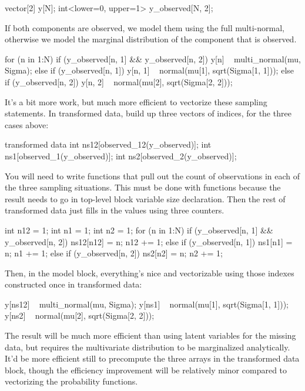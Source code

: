 \begin{stancode}
vector[2] y[N];
int<lower=0, upper=1> y_observed[N, 2];
\end{stancode}

If both components are observed, we model them using the full
multi-normal, otherwise we model the marginal distribution of the
component that is observed.

\begin{stancode}
for (n in 1:N) {
  if (y_observed[n, 1] && y_observed[n, 2])
    y[n] ~ multi_normal(mu, Sigma);
  else if (y_observed[n, 1])
    y[n, 1] ~ normal(mu[1], sqrt(Sigma[1, 1]));
  else if (y_observed[n, 2])
    y[n, 2] ~ normal(mu[2], sqrt(Sigma[2, 2]));
}
\end{stancode}

It's a bit more work, but much more efficient to vectorize these
sampling statements.  In transformed data, build up three vectors of
indices, for the three cases above:
%
\begin{stancode}
transformed data {
  int ns12[observed_12(y_observed)];
  int ns1[observed_1(y_observed)];
  int ns2[observed_2(y_observed)];
}
\end{stancode}
%
You will need to write functions that pull out the count of
observations in each of the three sampling situations.  This must be
done with functions because the result needs to go in top-level block
variable size declaration.  Then the rest of transformed data just
fills in the values using three counters.
%
\begin{stancode}
int n12 = 1;
int n1 = 1;
int n2 = 1;
for (n in 1:N) {
  if (y_observed[n, 1] && y_observed[n, 2]) {
    ns12[n12] = n;
    n12 += 1;
  } else if (y_observed[n, 1]) {
    ns1[n1] = n;
    n1 += 1;
  } else if (y_observed[n, 2]) {
    ns2[n2] = n;
    n2 += 1;
  }
}
\end{stancode}
%
Then, in the model block, everything's nice and vectorizable
using those indexes constructed once in transformed data:
%
\begin{stancode}
y[ns12] ~ multi_normal(mu, Sigma);
y[ns1] ~ normal(mu[1], sqrt(Sigma[1, 1]));
y[ns2] ~ normal(mu[2], sqrt(Sigma[2, 2]));
\end{stancode}
%
The result will be much more efficient than using latent variables for
the missing data, but requires the multivariate distribution to be
marginalized analytically.  It'd be more efficient still to precompute
the three arrays in the transformed data block, though the efficiency
improvement will be relatively minor compared to vectorizing the
probability functions.

